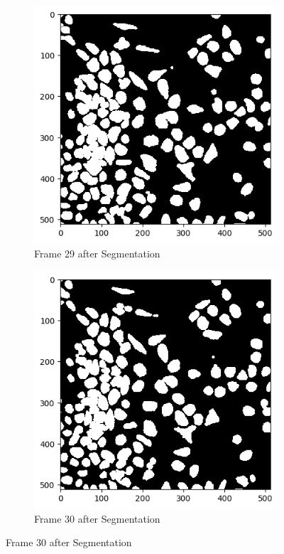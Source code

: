 \documentclass{article}
\begin{document}
\begin{figure}[h!]
  \begin{subfigure}{0.4\textwidth}
    \includegraphics[width=\linewidth]{Report/Appendix_Images/Segmentation-A-Control/frame_29.png}
    \caption*{Frame 29 after Segmentation}
  \end{subfigure}
  \hfill
  \begin{subfigure}{0.4\textwidth}
    \includegraphics[width=\linewidth]{Report/Appendix_Images/Segmentation-A-Control/frame_30.png}
    \caption*{Frame 30 after Segmentation}
  \end{subfigure}
\end{figure}
\end{document}
